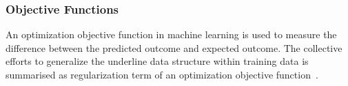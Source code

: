 \subsubsection{Objective Functions}
An optimization objective function in machine learning is used to measure the difference between the predicted outcome and expected outcome. The collective efforts to generalize the underline data structure within training data is summarised as regularization term of an optimization objective function~\cite{goodfellow_2015}.  